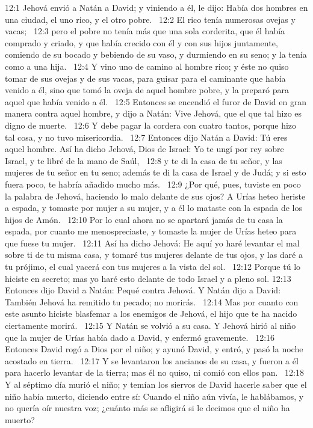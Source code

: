 12:1 Jehová envió a Natán a David; y viniendo a él, le dijo: Había dos hombres en una ciudad, el uno rico, y el otro pobre.  
12:2 El rico tenía numerosas ovejas y vacas;  
12:3 pero el pobre no tenía más que una sola corderita, que él había comprado y criado, y que había crecido con él y con sus hijos juntamente, comiendo de su bocado y bebiendo de su vaso, y durmiendo en su seno; y la tenía como a una hija.  
12:4 Y vino uno de camino al hombre rico; y éste no quiso tomar de sus ovejas y de sus vacas, para guisar para el caminante que había venido a él, sino que tomó la oveja de aquel hombre pobre, y la preparó para aquel que había venido a él.  
12:5 Entonces se encendió el furor de David en gran manera contra aquel hombre, y dijo a Natán: Vive Jehová, que el que tal hizo es digno de muerte.  
12:6 Y debe pagar la cordera con cuatro tantos, porque hizo tal cosa, y no tuvo misericordia.  
12:7 Entonces dijo Natán a David: Tú eres aquel hombre. Así ha dicho Jehová, Dios de Israel: Yo te ungí por rey sobre Israel, y te libré de la mano de Saúl,  
12:8 y te di la casa de tu señor, y las mujeres de tu señor en tu seno; además te di la casa de Israel y de Judá; y si esto fuera poco, te habría añadido mucho más.  
12:9 ¿Por qué, pues, tuviste en poco la palabra de Jehová, haciendo lo malo delante de sus ojos? A Urías heteo heriste a espada, y tomaste por mujer a su mujer, y a él lo mataste con la espada de los hijos de Amón.  
12:10 Por lo cual ahora no se apartará jamás de tu casa la espada, por cuanto me menospreciaste, y tomaste la mujer de Urías heteo para que fuese tu mujer.  
12:11 Así ha dicho Jehová: He aquí yo haré levantar el mal sobre ti de tu misma casa, y tomaré tus mujeres delante de tus ojos, y las daré a tu prójimo, el cual yacerá con tus mujeres a la vista del sol.  
12:12 Porque tú lo hiciste en secreto; mas yo haré esto delante de todo Israel y a pleno sol. 
12:13 Entonces dijo David a Natán: Pequé contra Jehová. Y Natán dijo a David: También Jehová ha remitido tu pecado; no morirás.  
12:14 Mas por cuanto con este asunto hiciste blasfemar a los enemigos de Jehová, el hijo que te ha nacido ciertamente morirá.  
12:15 Y Natán se volvió a su casa. Y Jehová hirió al niño que la mujer de Urías había dado a David, y enfermó gravemente.  
12:16 Entonces David rogó a Dios por el niño; y ayunó David, y entró, y pasó la noche acostado en tierra.  
12:17 Y se levantaron los ancianos de su casa, y fueron a él para hacerlo levantar de la tierra; mas él no quiso, ni comió con ellos pan.  
12:18 Y al séptimo día murió el niño; y temían los siervos de David hacerle saber que el niño había muerto, diciendo entre sí: Cuando el niño aún vivía, le hablábamos, y no quería oír nuestra voz; ¿cuánto más se afligirá si le decimos que el niño ha muerto?  
